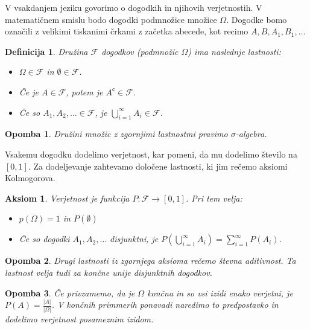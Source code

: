 \documentclass[10pt, a4paper]{article}
\newtheorem{defi}[izr]{Definicija}
\newtheorem{aksiom}{Aksiom}[section]
\newenvironment{noticeB}{%
  \tcolorbox[%
  notitle,
  empty,
  enhanced,  %
  breakable,
  coltext=black,
  colback=white, 
  fontupper=\rmfamily,
  noparskip,
  sharp corners,
  boxrule=-1pt,  %
  frame hidden,
  left=7pt,  %
  right=7pt,
  top=5pt,
  bottom=5pt,
  before skip=2.5ex plus 2pt,
  after skip=2.5ex plus 2pt,
  borderline west = {1.5pt}{-0.1pt}{blue!30!black}, %
  overlay unbroken and last={%
    \draw[color=black, line width=1.25pt]
    ($(frame.south west)+(1.pt, -0.1pt)$) -- ++(2em, 0);
  }
  ]}
{\endtcolorbox}
\newenvironment{definicija}{\begin{noticeB}\begin{defi}}{%
    \end{defi}\end{noticeB}}
\newtheorem*{opomba}{Opomba}
\begin{document}
V vsakdanjem jeziku govorimo o dogodkih in njihovih verjetnostih.
V matematičnem smislu bodo dogodki podmnožice množice $\Omega$.
Dogodke bomo označili z velikimi tiskanimi črkami z začetka abecede, kot recimo 
$A, B, A_1, B_1, \dots$

\begin{definicija}
    Družina $\mathcal{F}$ dogodkov (podmnožic $\Omega$) ima naslednje lastnosti:
    \begin{itemize}
        \item $\Omega \in \mathcal{F}$ in $\emptyset \in \mathcal{F}$.
        \item Če je $A \in \mathcal{F}$, potem je $A^{\mathsf{c}} \in \mathcal{F}$.
        \item Če so $A_1, A_2, \dots \in \mathcal{F}$, je $\bigcup_{i = 1} ^\infty A_i \in \mathcal{F}$.
    \end{itemize}
\end{definicija}

\begin{opomba}
    Družini množic z zgornjimi lastnostmi pravimo $\sigma$-algebra.
\end{opomba}

Vsakemu dogodku dodelimo verjetnost, kar pomeni, da mu dodelimo število na $[0, 1]$.
Za dodeljevanje zahtevamo določene lastnosti, ki jim rečemo aksiomi Kolmogorova.

\begin{aksiom}
    Verjetnost je funkcija $P: \mathcal{F} \to [0, 1]$. Pri tem velja:
    \begin{itemize}
        \item $p(\Omega) = 1$ in $P(\emptyset)$
        \item Če so dogodki $A_1, A_2, \dots$ disjunktni, je $P \left(\bigcup_{i = 1} ^\infty A_i\right) = \sum_{i = 1} ^\infty P(A_i)$.
    \end{itemize}
\end{aksiom}

\begin{opomba}
    Drugi lastnosti iz zgornjega aksioma rečemo števna aditivnost.
    Ta lastnost velja tudi za končne unije disjunktnih dogodkov.
\end{opomba}

\begin{opomba}
    Če privzamemo, da je $\Omega$ končna in so vsi izidi enako verjetni, je $P(A) = \frac{|A|}{|\Omega|}$.
    V končnih primmerih ponavadi naredimo to predpostavko in dodelimo verjetnost posameznim izidom.
\end{opomba}
\end{document}
